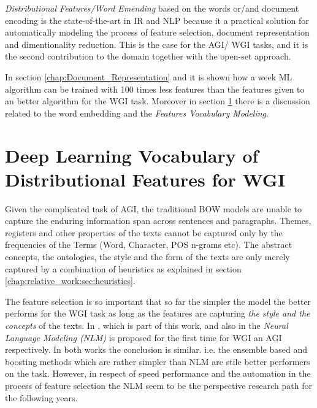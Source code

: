 \textit{Distributional Features/Word Emending} based on the words or/and document encoding is the state-of-the-art in IR and NLP because it a practical solution for automatically modeling the process of feature selection, document representation and dimentionality reduction. This is the case for the AGI/ WGI tasks, and it is the second contribution to the domain together with the open-set approach.

In section \ref{chap:Document_Representation} and it is shown how a week ML algorithm can be trained with 100 times less features than the features given to an better algorithm for the WGI task. Moreover in section \ref{chap:relevant_work:sec:word_embedding} there is a discussion related to the word embedding and the \textit{Features Vocabulary Modeling}.


\section{Deep Learning Vocabulary of Distributional Features for WGI}\label{chap:relevant_work:sec:word_embedding}

Given the complicated task of AGI, the traditional BOW models are unable to capture the enduring information span across sentences and paragraphs. Themes, registers and other properties of the texts cannot be captured only by the frequencies of the Terms (Word, Character, POS n-grams etc). The abstract concepts, the ontologies, the style and the form of the texts are only merely captured by a combination of heuristics as explained in section \ref{chap:relative_work:sec:heuristics}. 

The feature selection is so important that so far the simpler the model the better performs for the WGI task as long as the features are capturing \textit{the style and the concepts} of the texts. In \parencite{pritsos2019open}, which is part of this work, and also in \parencite{worsham2018genre} the \textit{Neural Language Modeling (NLM)} is proposed for the first time for WGI an AGI respectively. In both works the conclusion is similar. i.e. the ensemble based and boosting methods which are rather simpler than NLM are stile better performers on the task. However, in respect of speed performance and the automation in the process of feature selection the NLM seem to be the perspective research path for the following years.

